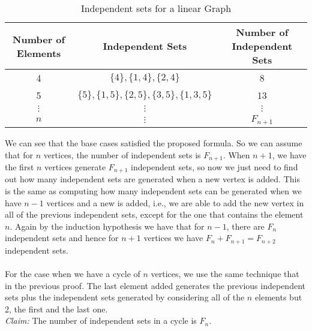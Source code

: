 \documentclass[tikz, 12pt]{scrartcl}
\begin{document}
\begin{enumerate}
\begin{longtable}{|c|c|c|}
\caption{Independent sets for a linear Graph\label{advancedLinearGraph}}\\
\hline
Number of Elements	&	Independent Sets	&	Number of Independent Sets\\
\hline
	4			&	$\{4\}, \{1, 4\}, \{2,4\}$				&	8	\\
	5			&	$\{5\}, \{1, 5\}, \{2, 5\}, \{3, 5\}, \{1, 3, 5\}$	&	13 \\
	$\vdots$		&	$\vdots$							&	$\vdots$\\
	$n$			&	$\vdots$							&	$F_{n + 1}	$\\
\hline
\end{longtable}	 

We can see that the base cases satisfied the proposed formula. So we can assume that for $n$ vertices, the number of independent sets is $F_{n + 1}$. When $n + 1$, we have the first $n$ vertices generate $F_{n + 1}$ independent sets, so now we just need to find out how many independent sets are generated when a new vertex is added. This is the same as computing how many independent sets can be generated when we have $n - 1$ vertices and a new is added, i.e., we are able to add the new vertex in all of the previous independent sets, except for the one that contains the element $n$. Again by the induction hypothesis we have that for $n- 1$, there are $F_{n}$ independent sets and hence for $n + 1$ vertices we have $F_{n} + F_{n + 1} = F_{n + 2}$ independent sets.\\
\\
For the case when we have a cycle of $n$ vertices, we use the same technique that in the previous proof. The last element added generates the previous independent sets plus the independent sets generated by considering all of the $n$ elements but 2, the first and the last one.\\
\textit{Claim:} The number of independent sets in a cycle is $F_{n} $.


\end{enumerate}
\end{document}
